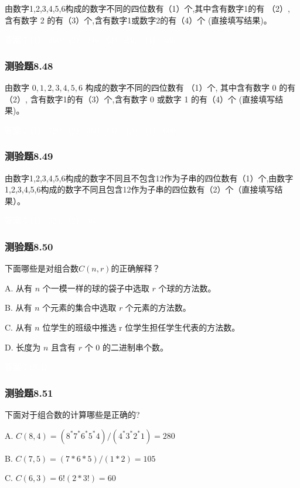 \documentclass[UTF8, heading=true]{ctexart}
\begin{document}
由数字1,2,3,4,5,6构成的数字不同的四位数有（1）个,其中含有数字1的有
（2）, 含有数字 2 的有（3）个,含有数字1或数字2的有（4）个 (直接填写结果)。

\textcolor{white}{答案：（1） 360 （2） 240 （3） 240 （4） 336}

\subsubsection{测验题8.48}

由数字 $0,1,2,3,4,5,6$ 构成的数字不同的四位数有 （1）个, 其中含有数字 0 的有
（2）, 含有数字1的有（3）个,含有数字 0 或数字 1 的有（4）个 (直接填写结果)。

\textcolor{white}{答案：（1） 720 （2） 360 （3） 420 （4） 600}

\subsubsection{测验题8.49}
由数字1,2,3,4,5,6构成的数字不同且不包含12作为子串的四位数有（1）个,由数字1,2,3,4,5,6构成的数字不同且包含12作为子串的四位数有（2）个（直接填写结果）。

\textcolor{white}{答案：（1） 324 （2） 36}

\subsubsection{测验题8.50}

下面哪些是对组合数$C(n, r)$的正确解释？

A. 从有 $n$ 个一模一样的球的袋子中选取 $r$ 个球的方法数。

B. 从有 $n$ 个元素的集合中选取 $r$ 个元素的方法数。

C. 从有 $n$ 位学生的班级中推选 r 位学生担任学生代表的方法数。

D. 长度为 $n$ 且含有 $r$ 个 0 的二进制串个数。

\textcolor{white}{答案：BCD}

\subsubsection{测验题8.51}

下面对于组合数的计算哪些是正确的?

A. $C(8,4)=\left(8^* 7^* 6^* 5^* 4\right) /\left(4^* 3^* 2^* 1\right)=280$

B. $C(7,5)=(7 * 6 * 5) /(1 * 2)=105$

C. $C(6,3)=6!(2 * 3!)=60$
\end{document}
